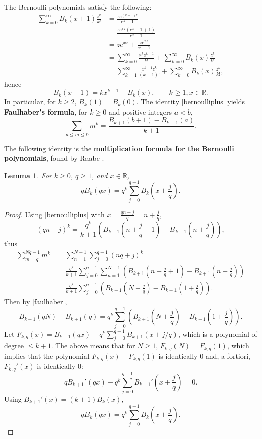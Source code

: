 \documentclass{article}
\newtheorem{lemma}[theorem]{Lemma}
\begin{document}
The Bernoulli polynomials  satisfy the following:
\begin{align*}
\sum_{k=0}^\infty B_k(x+1) \frac{z^k}{k!}&=\frac{ze^{(x+1)z}}{e^z-1}\\
&=\frac{ze^{xz} (e^z-1+1)}{e^z-1}\\
&=ze^{xz}+\frac{ze^{xz}}{e^z-1}\\
&=\sum_{k=0}^\infty \frac{x^k z^{k+1}}{k!} + \sum_{k=0}^\infty B_k(x) \frac{z^k}{k!}\\
&=\sum_{k=1}^\infty \frac{x^{k-1} z^k}{(k-1)!} +  \sum_{k=0}^\infty B_k(x) \frac{z^k}{k!},
\end{align*}
hence
\begin{equation}
B_k(x+1) = kx^{k-1} + B_k(x),\qquad k \geq 1, x \in \mathbb{R}.
\label{bernoulliplus}
\end{equation}
In particular, for $k \geq 2$,
$B_k(1)=B_k(0)$.
The  identity  \eqref{bernoulliplus} yields \textbf{Faulhaber's formula}, for $k \geq 0$ and positive integers $a < b$,
\begin{equation}
\sum_{a \leq m \leq b} m^k = \frac{B_{k+1}(b+1)-B_{k+1}(a)}{k+1}.
\label{faulhaber}
\end{equation}



The following identity is  the \textbf{multiplication formula for the Bernoulli polynomials}, found by Raabe \cite[pp.~19--24,
\S 13]{raabe}.

\begin{lemma}
For $k \geq 0$, $q \geq 1$, and $x \in \mathbb{R}$,
\[ 
q B_k(qx) = q^k \sum_{j=0}^{q-1} B_k\left(x+\frac{j}{q}\right).
\]
\label{bernoullisum}
\end{lemma}
\begin{proof}
Using \eqref{bernoulliplus} with $x=\frac{qn+j}{q}=n+\frac{j}{q}$,
\[
(qn+j)^k  = \frac{q^k}{k+1} \left( B_{k+1} \left(n+\frac{j}{q}+1\right) - B_{k+1}\left(n+\frac{j}{q}\right)\right),
\]
 thus
\begin{align*}
\sum_{m=q}^{Nq-1} m^k& = \sum_{n=1}^{N-1} \sum_{j=0}^{q-1} (nq+j)^k \\
&= \frac{q^k}{k+1} \sum_{j=0}^{q-1} \sum_{n=1}^{N-1} \left( B_{k+1} \left(n+\frac{j}{q}+1\right) - B_{k+1}\left(n+\frac{j}{q}\right)\right)\\
&= \frac{q^k}{k+1} \sum_{j=0}^{q-1} \left( B_{k+1} \left(N+\frac{j}{q}\right)-B_{k+1}\left(1+\frac{j}{q}\right)\right).
\end{align*}
Then by \eqref{faulhaber},
\[
B_{k+1}(qN)-B_{k+1}(q) = q^k \sum_{j=0}^{q-1} \left( B_{k+1} \left(N+\frac{j}{q}\right)-B_{k+1}\left(1+\frac{j}{q}\right)\right).
\]
Let $F_{k,q}(x) = B_{k+1}(qx) - q^k \sum_{j=0}^{q-1} B_{k+1} (x+ j/q)$, 
which is a polynomial of degree $\leq k+1$. The above means 
that for $N \geq 1$, $F_{k,q}(N)=F_{k,q}(1)$, which implies that the polynomial $F_{k,q}(x)-F_{k,q}(1)$ is identically $0$
and, a fortiori, $F_{k,q}'(x)$ is identically $0$:
\[
q B_{k+1}'(qx) - q^k \sum_{j=0}^{q-1} B_{k+1}'\left(x+\frac{j}{q} \right) = 0.
\]
Using $B_{k+1}'(x) = (k+1) B_k(x)$,
\[
q B_k(qx) = q^k \sum_{j=0}^{q-1} B_k\left(x+\frac{j}{q}\right).
\]
\end{proof}
\end{document}
